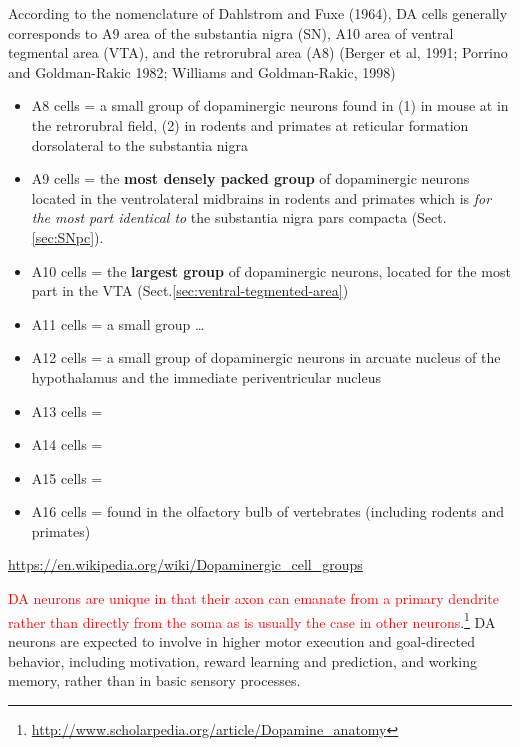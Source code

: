 \begin{mdframed}

According to the nomenclature of Dahlstrom and Fuxe (1964), DA cells generally
corresponds to A9 area of the substantia nigra (SN), A10 area of ventral
tegmental area (VTA), and the retrorubral area (A8) (Berger et al, 1991; Porrino and
Goldman-Rakic 1982; Williams and Goldman-Rakic, 1998)


\begin{itemize}
  \item A8 cells = a small group of dopaminergic neurons found in (1) in mouse
  at in the retrorubral field, (2) in rodents and primates at reticular
  formation dorsolateral to the substantia nigra

  \item A9 cells = the {\bf most densely packed group} of dopaminergic neurons
  located in the ventrolateral midbrains in rodents and primates which is {\it
  for the most part identical to} the substantia nigra pars compacta
  (Sect.\ref{sec:SNpc}).
  

  \item A10 cells = the {\bf largest group} of dopaminergic neurons, located for
  the most part in the VTA (Sect.\ref{sec:ventral-tegmented-area})
  
  \item A11 cells = a small group \ldots
  
  \item A12 cells =  a small group of dopaminergic neurons in arcuate nucleus of
  the hypothalamus and the immediate periventricular nucleus
  
  \item A13 cells = 
  
  \item A14 cells = 
  
  \item A15 cells = 
  
  \item A16 cells = found in the olfactory bulb of vertebrates (including
  rodents and primates)
\end{itemize}
\url{https://en.wikipedia.org/wiki/Dopaminergic_cell_groups}
\end{mdframed}


\textcolor{red}{DA neurons are unique in that their axon can emanate from a
primary dendrite rather than directly from the soma as is usually the case in
other
neurons}.\footnote{\url{http://www.scholarpedia.org/article/Dopamine_anatomy}}
DA neurons are expected to involve in higher motor execution and goal-directed
behavior, including motivation, reward learning and prediction, and working
memory, rather than in basic sensory processes.

